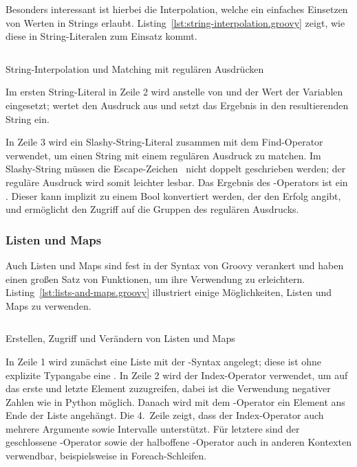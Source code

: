 \documentclass[a4paper]{article}
\newcommand{\codelisting}[3]{\begin{listing}[htp]
	\inputminted{#1}{#1/#2}
	\vspace{-3ex}
	\caption{#3}
	\label{lst:#2}
\end{listing}}
\begin{document}
Besonders interessant ist hierbei die Interpolation, welche ein einfaches Einsetzen von Werten in Strings erlaubt.
Listing~\ref{lst:string-interpolation.groovy} zeigt, wie diese in String-Literalen zum Einsatz kommt.

\codelisting{groovy}{string-interpolation.groovy}{String-Interpolation und Matching mit regulären Ausdrücken}

Im ersten String-Literal in Zeile 2 wird anstelle von  und  der Wert der Variablen eingesetzt;
 wertet den Ausdruck  aus und setzt das Ergebnis in den resultierenden String ein.

In Zeile 3 wird ein Slashy-String-Literal zusammen mit dem Find-Operator \code{=~} verwendet, um einen String mit einem regulären Ausdruck zu matchen.
Im Slashy-String müssen die Escape-Zeichen~\plain{\ } nicht doppelt geschrieben werden; der reguläre Ausdruck wird somit leichter lesbar.
Das Ergebnis des \code{=~}-Operators ist ein .
Dieser kann implizit zu einem Bool konvertiert werden, der den Erfolg angibt, und ermöglicht den Zugriff auf die Gruppen des regulären Ausdrucks.

\subsubsection{Listen und Maps}\label{subsubsec:listen-und-maps}

Auch Listen und Maps sind fest in der Syntax von Groovy verankert und haben einen großen Satz von Funktionen, um ihre Verwendung zu erleichtern.
Listing~\ref{lst:lists-and-maps.groovy} illustriert einige Möglichkeiten, Listen und Maps zu verwenden.

\codelisting{groovy}{lists-and-maps.groovy}{Erstellen, Zugriff und Verändern von Listen und Maps}

In Zeile 1 wird zunächst eine Liste mit der \code{[]}-Syntax angelegt;
diese ist ohne explizite Typangabe eine .
In Zeile 2 wird der Index-Operator verwendet, um auf das erste und letzte Element zuzugreifen, dabei ist die Verwendung negativer Zahlen wie in Python möglich.
Danach wird mit dem \code{<<}-Operator ein Element ans Ende der Liste angehängt.
Die 4.~Zeile zeigt, dass der Index-Operator auch mehrere Argumente sowie Intervalle unterstützt.
Für letztere sind der geschlossene -Operator sowie der halboffene -Operator auch in anderen Kontexten verwendbar, beispielsweise in Foreach-Schleifen.
\end{document}
